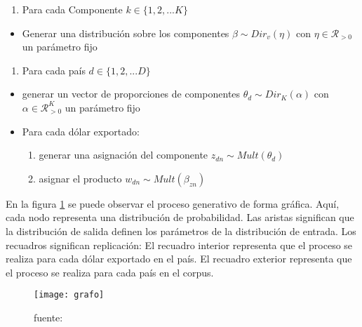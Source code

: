 \documentclass[class=article, crop=false]{standalone}
\begin{document}
\begin{enumerate}
\def\labelenumi{\arabic{enumi}.}
\item
Para cada Componente $k \in \{1,2,... K\}$
\end{enumerate}

\begin{itemize}
\item
Generar una distribución sobre los componentes
$\beta \sim Dir_v(\eta)$ con $\eta \in \mathcal{R}_{>0}$ un
parámetro fijo
\end{itemize}

\begin{enumerate}
\def\labelenumi{\arabic{enumi}.}
\setcounter{enumi}{1}
\item
Para cada país $d \in \{1,2,... D\}$
\end{enumerate}

\begin{itemize}
\item
generar un vector de proporciones de componentes
$\theta_d \sim Dir_K(\alpha)$ con $\alpha \in \mathcal{R}_{>0}^K$
un parámetro fijo
\item
Para cada dólar exportado:

\begin{enumerate}
	\def\labelenumi{\roman{enumi}.}
	\item
	generar una asignación del componente $z_{dn} \sim Mult(\theta_d)$
	\item
	asignar el producto $w_{dn} \sim Mult(\beta_{zn})$
\end{enumerate}
\end{itemize}

En la figura \ref{fig:grafo_blei} se puede observar el proceso generativo de forma gráfica. Aquí, cada nodo representa una distribución de probabilidad. Las aristas significan que la distribución de salida definen los parámetros de la distribución de entrada. Los recuadros significan replicación: El recuadro interior representa que el proceso se realiza para cada dólar exportado en el país. El recuadro exterior representa que el proceso se realiza para cada
país en el corpus.


\begin{figure}
	\centering	
	\texttt{[image: grafo]}
	\caption{fuente: \cite{blei2003latent}}
	\label{fig:grafo_blei}
\end{figure}
\end{document}
